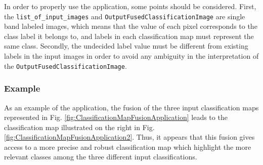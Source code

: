 In order to properly use the  application, some points should be considered. First, the \verb?list_of_input_images?
and \verb?OutputFusedClassificationImage? are single band labeled images, which means that the value of each pixel corresponds to the class label it belongs
to, and labels in each classification map must represent the same class. Secondly, the undecided label value must be different from existing labels in the input images in order to avoid any ambiguity in the interpretation of
the \verb?OutputFusedClassificationImage?.



\subsubsection{Example}

As an example of the  application, the fusion of the three input classification maps represented in
Fig. \ref{fig:ClassificationMapFusionApplication} leads to the classification map illustrated on the right in Fig. \ref{fig:ClassificationMapFusionApplication2}.
Thus, it appears that this fusion gives access to a more precise and robust classification map which highlight the more relevant classes among the three different input
classifications.


